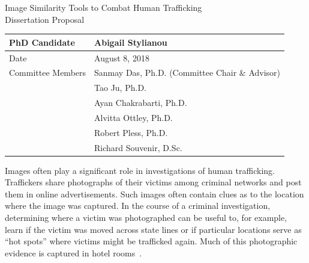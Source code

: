 \documentclass[12pt]{article}
\begin{document}
\begin{center}
    {\Large Image Similarity Tools to Combat Human Trafficking}\\
    {\Small Dissertation Proposal}
    
    
    \vspace{1.5in}
        \begin{tabular}{|l|l|}
        \hline
        PhD Candidate    & Abigail Stylianou\\
        \hline
        Date & August 8, 2018 \\
        \hline
        Committee Members & Sanmay Das, Ph.D. (Committee Chair \& Advisor) \\
            & Tao Ju, Ph.D. \\
            & Ayan Chakrabarti, Ph.D. \\
            & Alvitta Ottley, Ph.D. \\
            & Robert Pless, Ph.D. \\
            & Richard Souvenir, D.Sc. \\
            \hline
        \end{tabular}
\end{center}
\newpage

\thispagestyle{empty}
\setcounter{tocdepth}{3}
\tableofcontents
\newpage
\thispagestyle{empty}
\listoffigures
\newpage

\doublespacing
{}
\setcounter{page}{1}

Images often play a significant role in investigations of human trafficking. Traffickers share photographs of their victims among criminal networks and  post them in online advertisements. Such images often contain clues as to
the location where the image was captured. In the course of a criminal investigation, determining where a victim was photographed can be useful to, for example, learn if the victim was moved across state lines or if particular locations serve as ``hot spots'' where victims might be trafficked again. Much of this photographic evidence is captured in hotel rooms~\cite{stltodayHotels}.
\end{document}
